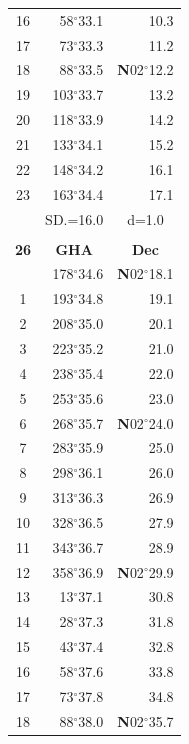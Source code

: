 \documentclass[10pt, a4paper]{report}
\begin{document}
\begin{scriptsize}
\begin{tabular*}{0.2\textwidth}[t]{@{\extracolsep{\fill}}|c|rr|}
16 & 58$^\circ$33.1 & 10.3\\
17 & 73$^\circ$33.3 & 11.2\\[2Pt]
18 & 88$^\circ$33.5 & \textbf{N}02$^\circ$12.2\\
19 & 103$^\circ$33.7 & 13.2\\
20 & 118$^\circ$33.9 & 14.2\\
21 & 133$^\circ$34.1 & \raisebox{0.24ex}{\boldmath$\cdot$~\boldmath$\cdot$~~}15.2\\
22 & 148$^\circ$34.2 & 16.1\\
23 & 163$^\circ$34.4 & 17.1\\
\hline
\rule{0pt}{2.4ex} & \multicolumn{1}{c}{SD.=16.0} & \multicolumn{1}{c|}{d=1.0}\\
\hline
\multicolumn{1}{c}{}\\[-0.5ex]\hline
\multicolumn{1}{|c|}{\rule{0pt}{2.6ex}\textbf{26}} & \multicolumn{1}{c}{\textbf{GHA}} & \multicolumn{1}{c|}{\textbf{Dec}}\\
\hline\rule{0pt}{2.6ex}\noindent
0 & 178$^\circ$34.6 & \textbf{N}02$^\circ$18.1\\
1 & 193$^\circ$34.8 & 19.1\\
2 & 208$^\circ$35.0 & 20.1\\
3 & 223$^\circ$35.2 & \raisebox{0.24ex}{\boldmath$\cdot$~\boldmath$\cdot$~~}21.0\\
4 & 238$^\circ$35.4 & 22.0\\
5 & 253$^\circ$35.6 & 23.0\\[2Pt]
6 & 268$^\circ$35.7 & \textbf{N}02$^\circ$24.0\\
7 & 283$^\circ$35.9 & 25.0\\
8 & 298$^\circ$36.1 & 26.0\\
9 & 313$^\circ$36.3 & \raisebox{0.24ex}{\boldmath$\cdot$~\boldmath$\cdot$~~}26.9\\
10 & 328$^\circ$36.5 & 27.9\\
11 & 343$^\circ$36.7 & 28.9\\[2Pt]
12 & 358$^\circ$36.9 & \textbf{N}02$^\circ$29.9\\
13 & 13$^\circ$37.1 & 30.8\\
14 & 28$^\circ$37.3 & 31.8\\
15 & 43$^\circ$37.4 & \raisebox{0.24ex}{\boldmath$\cdot$~\boldmath$\cdot$~~}32.8\\
16 & 58$^\circ$37.6 & 33.8\\
17 & 73$^\circ$37.8 & 34.8\\[2Pt]
18 & 88$^\circ$38.0 & \textbf{N}02$^\circ$35.7\\

\end{tabular*}
\end{scriptsize}
\end{document}
